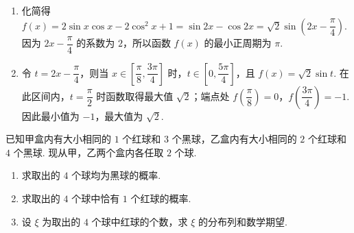\begin{solution}
\begin{enumerate}
\item 化简得 \(f(x)=2\sin x\cos x-2\cos^2x+1=\sin 2x-\cos 2x=\sqrt{2}\sin\left(2x-\dfrac{\pi}{4}\right)\). 因为 \(2x-\dfrac{\pi}{4}\) 的系数为 \(2\)，所以函数 \(f(x)\) 的最小正周期为 \(\pi\).
\item 令 \(t=2x-\dfrac{\pi}{4}\)，则当 \(x\in\left[\dfrac{\pi}{8},\dfrac{3\pi}{4}\right]\) 时，\(t\in\left[0,\dfrac{5\pi}{4}\right]\)，且 \(f(x)=\sqrt{2}\sin t\). 在此区间内，\(t=\dfrac{\pi}{2}\) 时函数取得最大值 \(\sqrt{2}\)；端点处 \(f\left(\dfrac{\pi}{8}\right)=0\)，\(f\left(\dfrac{3\pi}{4}\right)=-1\). 因此最小值为 \(-1\)，最大值为 \(\sqrt{2}\).
\end{enumerate}
\end{solution}

\begin{problem}
已知甲盒内有大小相同的 \(1\) 个红球和 \(3\) 个黑球，乙盒内有大小相同的 \(2\) 个红球和 \(4\) 个黑球. 现从甲，乙两个盒内各任取 \(2\) 个球.

\begin{enumerate}
\item 求取出的 \(4\) 个球均为黑球的概率.
\item 求取出的 \(4\) 个球中恰有 \(1\) 个红球的概率.
\item 设 \(\xi\) 为取出的 \(4\) 个球中红球的个数，求 \(\xi\) 的分布列和数学期望.
\end{enumerate}
\end{problem}

